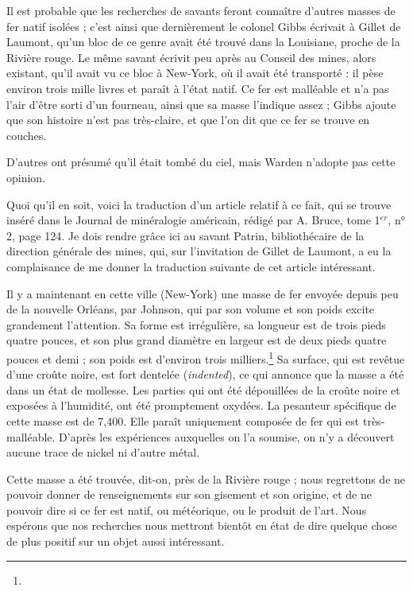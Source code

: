 \documentclass[a4paper, 12pt, oneside, french]{article}
\begin{document}
Il est probable que les recherches de savants feront connaître d'autres masses de fer natif isolées ; c'est ainsi que dernièrement le colonel Gibbs écrivait à Gillet de Laumont, qu'un bloc de ce genre avait été trouvé dans la Louisiane, proche de la Rivière rouge. Le même savant écrivit peu après au Conseil des mines, alors existant, qu'il avait vu ce bloc à New-York, où il avait été transporté : il pèse environ trois mille livres et paraît à l'état natif. Ce fer est malléable et n'a pas l'air d'être sorti d'un fourneau, ainsi que sa masse l'indique assez ; Gibbs ajoute que son histoire n'est pas très-claire, et que l'on dit que ce fer se trouve en couches.

D'autres ont présumé qu'il était tombé du ciel, mais Warden n'adopte pas cette opinion.

Quoi qu'il en soit, voici la traduction d'un article relatif à ce fait, qui se trouve inséré dans le Journal de minéralogie américain, rédigé par A. Bruce, tome 1$^{er}$, n° 2, page 124. Je dois rendre grâce ici au savant Patrin, bibliothécaire de la direction générale des mines, qui, sur l'invitation de Gillet de Laumont, a eu la complaisance de me donner la traduction suivante de cet article intéressant.

\og Il y a maintenant en cette ville (New-York) une masse de fer envoyée depuis peu de la nouvelle Orléans, par Johnson, qui par son volume et son poids excite grandement l'attention. Sa forme est irrégulière, sa longueur est de trois pieds quatre pouces, et son plus grand diamètre en largeur est de deux pieds quatre pouces et demi ; son poids est d'environ trois milliers.\footnote{} Sa surface, qui est revêtue d'une croûte noire, est fort dentelée (\emph{indented}), ce qui annonce que la masse a été dans un état de mollesse. Les parties qui ont été dépouillées de la croûte noire et exposées à l'humidité, ont été promptement oxydées. La pesanteur spécifique de cette masse est de 7,400. Elle paraît uniquement composée de fer qui est très-malléable. D'après les expériences auxquelles on l'a soumise, on n'y a découvert aucune trace de nickel ni d'autre métal. \fg

\og Cette masse a été trouvée, dit-on, près de la Rivière rouge ; nous regrettons de ne pouvoir donner de renseignements sur son gisement et son origine, et de ne pouvoir dire si ce fer est natif, ou météorique, ou le produit de l'art. Nous espérons que nos recherches nous mettront bientôt en état de dire quelque chose de plus positif sur un objet aussi intéressant. \fg
\end{document}
